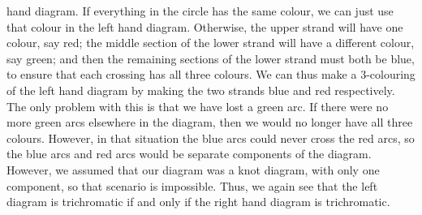 \documentclass[a4paper]{amsart}
\begin{document}
\begin{solution}
\begin{enumerate}
\begin{enumerate}
     hand diagram.  If everything in the circle has the same colour,
     we can just use that colour in the left hand diagram.  Otherwise,
     the upper strand will have one colour, say red; the middle
     section of the lower strand will have a different colour, say
     green; and then the remaining sections of the lower strand must
     both be blue, to ensure that each crossing has all three
     colours.  We can thus make a $3$-colouring of the left hand
     diagram by making the two strands blue and red respectively.  The
     only problem with this is that we have lost a green arc.  If
     there were no more green arcs elsewhere in the diagram, then we
     would no longer have all three colours.  However, in that
     situation the blue arcs could never cross the red arcs, so the
     blue arcs and red arcs would be separate components of the
     diagram.  However, we assumed that our diagram was a knot
     diagram, with only one component, so that scenario is impossible.
     Thus, we again see that the left diagram is trichromatic
     if and only if the right hand diagram is trichromatic.


\end{enumerate}
\end{enumerate}
\end{solution}
\end{document}
